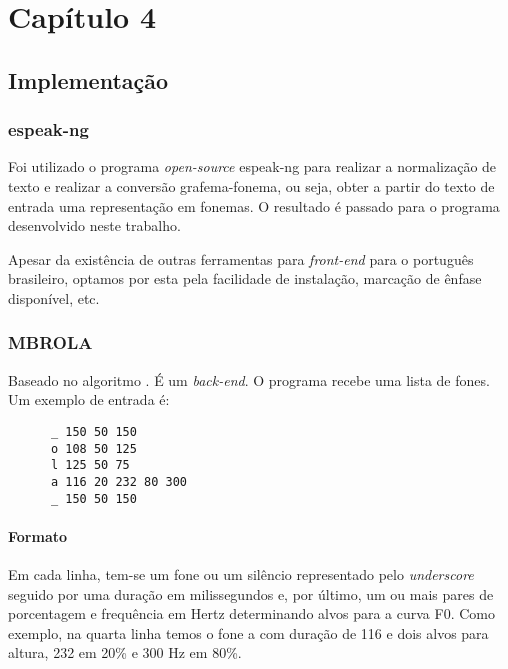 
\chapter{Capítulo 4}

\section{Implementação}

\subsection{espeak-ng}
Foi utilizado o programa \emph{open-source} espeak-ng \cite{espeakng} para realizar a normalização de texto e realizar a conversão grafema-fonema, ou seja, obter a partir do texto de entrada uma representação em fonemas. O resultado é passado para o programa desenvolvido neste trabalho.

Apesar da existência de outras ferramentas para \emph{front-end} para o português brasileiro, optamos por esta pela facilidade de instalação, marcação de ênfase disponível, etc.

\subsection{MBROLA}
Baseado no algoritmo  \cite{mbrpsola}. É um \emph{back-end}. O programa recebe uma lista de fones. Um exemplo de entrada é:

\begin{lstlisting}
      _ 150 50 150
      o 108 50 125
      l 125 50 75
      a 116 20 232 80 300
      _ 150 50 150
\end{lstlisting}

\subsubsection{Formato}
Em cada linha, tem-se um fone ou um silêncio representado pelo \emph{underscore} seguido por uma duração em milissegundos e, por último, um ou mais pares de porcentagem e frequência em Hertz determinando alvos para a curva F0. Como exemplo, na quarta linha temos o fone \/a\/ com duração de 116  e dois alvos para altura, 232  em 20\% e 300 Hz em 80\%.

